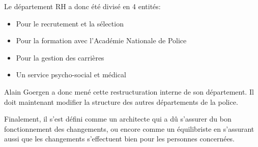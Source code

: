 Le département RH a donc été divisé en 4 entités:
\begin{itemize}
	\item Pour le recrutement et la sélection
	\item Pour la formation avec l'Académie Nationale de Police
	\item Pour la gestion des carrières
	\item Un service psycho-social et médical\newline
\end{itemize}

Alain Goergen a donc mené cette restructuration interne de son département. Il doit maintenant modifier la structure des autres départements de la police.\newline

Finalement, il s'est défini comme un architecte qui a dû s'assurer du bon fonctionnement des changements, ou encore comme un équilibriste en s'assurant aussi que les changements s'effectuent bien pour les personnes concernées.\newline
